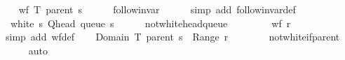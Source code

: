 \begin{isabellebody}
\ \ \isamarkupfalse%
\ {\isachardoublequoteopen}wf\ {\isacharparenleft}{\kern0pt}T\ {\isacharparenleft}{\kern0pt}parent\ s{\isacharparenright}{\kern0pt}{\isacharparenright}{\kern0pt}{\isachardoublequoteclose}\isanewline
\ \ \ \ \isamarkupfalse%
\ follow{\isacharunderscore}{\kern0pt}invar\isanewline
\ \ \ \ \isamarkupfalse%
\ {\isacharparenleft}{\kern0pt}simp\ add{\isacharcolon}{\kern0pt}\ follow{\isacharunderscore}{\kern0pt}invar{\isacharunderscore}{\kern0pt}def{\isacharparenright}{\kern0pt}\isanewline
\ \ \isamarkupfalse%
\ {\isachardoublequoteopen}{\isasymnot}\ white\ s\ {\isacharparenleft}{\kern0pt}Q{\isacharunderscore}{\kern0pt}head\ {\isacharparenleft}{\kern0pt}queue\ s{\isacharparenright}{\kern0pt}{\isacharparenright}{\kern0pt}{\isachardoublequoteclose}\isanewline
\ \ \ \ \isamarkupfalse%
\ not{\isacharunderscore}{\kern0pt}white{\isacharunderscore}{\kern0pt}head{\isacharunderscore}{\kern0pt}queue\isanewline
\ \ \ \ \isacommand{{\isachardot}{\kern0pt}}\isamarkupfalse%
\isanewline
\ \ \isamarkupfalse%
\ {\isachardoublequoteopen}wf\ {\isacharquery}{\kern0pt}r{\isachardoublequoteclose}\isanewline
\ \ \ \ \isamarkupfalse%
\ {\isacharparenleft}{\kern0pt}simp\ add{\isacharcolon}{\kern0pt}\ wf{\isacharunderscore}{\kern0pt}def{\isacharparenright}{\kern0pt}\isanewline
\ \ \isamarkupfalse%
\ {\isachardoublequoteopen}Domain\ {\isacharparenleft}{\kern0pt}T\ {\isacharparenleft}{\kern0pt}parent\ s{\isacharparenright}{\kern0pt}{\isacharparenright}{\kern0pt}\ {\isasyminter}\ Range\ {\isacharquery}{\kern0pt}r\ {\isacharequal}{\kern0pt}\ {\isacharbraceleft}{\kern0pt}{\isacharbraceright}{\kern0pt}{\isachardoublequoteclose}\isanewline
\ \ \ \ \isamarkupfalse%
\ not{\isacharunderscore}{\kern0pt}white{\isacharunderscore}{\kern0pt}if{\isacharunderscore}{\kern0pt}parent\isanewline
\ \ \ \ \isamarkupfalse%
\ auto\isanewline
{}\isamarkupfalse%
%
\endisatagproof
{\isafoldproof}%
%
\isadelimproof
%
\endisadelimproof
%
\begin{isamarkuptext}%

\end{isamarkuptext}
\end{isabellebody}
